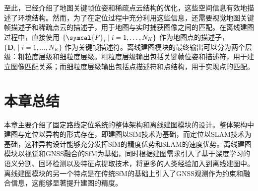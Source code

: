 至此，已经介绍了地图关键帧位姿和稀疏点云结构的优化，这些空间信息有效地描述了环境结构。然而，为了在定位过程中充分利用这些信息，还需要视觉地图关键帧描述子和稀疏点云的描述子，用于地图与实时捕获图像之间的匹配。在离线建图过程中，直接使用 $\{\symcal{F}_i \mid i = 1, \ldots, N_K\}$ 作为地图点的描述子，$\{\symbf{D}_i \mid i = 1, \ldots, N_K\}$ 作为关键帧描述符。离线建图模块的最终输出可以分为两个层级：粗粒度层级和细粒度层级。粗粒度层级输出包括关键帧位姿和描述符，用于建立图像匹配关系；而细粒度层级输出包括点描述符和点结构，用于实现点的匹配。

\section{本章总结}
本章主要介绍了固定路线定位系统的整体架构和离线建图模块的设计。整体架构中建图与定位以异构的形式存在，即建图以SfM技术为基础，而定位以SLAM技术为基础，这种异构设计能够充分发挥SfM的精度优势和SLAM的速度优势。离线建图模块以视觉和GNSS融合的SfM为基础，同时根据建图需求引入了基于深度学习的语义分割、回环检测以及特征点提取技术，将更多的人类经验加入到离线建图中。离线建图模块的另一个特点是在传统SfM的基础上引入了GNSS观测作为约束和融合信息，这能够显著提升建图的精度。
